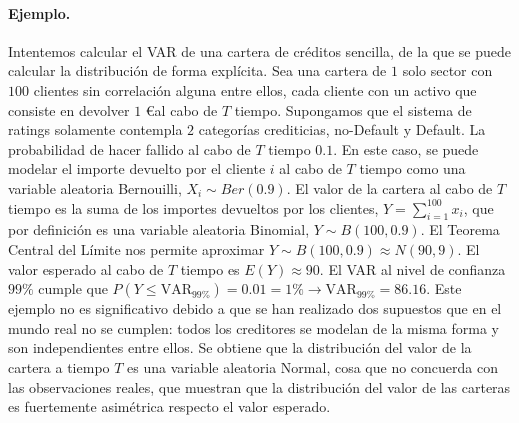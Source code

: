\paragraph{Ejemplo.} Intentemos calcular el VAR de una cartera de cr\'editos
sencilla, de la que se puede calcular la distribuci\'on de forma expl\'icita. 
Sea una cartera de $1$ solo sector con $100$ clientes sin correlaci\'on alguna
entre ellos, cada cliente con un activo que consiste en devolver $1$ \euro al 
cabo de $T$ tiempo. Supongamos que el sistema de ratings solamente contempla 
$2$ categor\'ias crediticias, no-Default y Default. La probabilidad de hacer 
fallido al cabo de $T$ tiempo $0.1$.
\newline
\newline
En este caso, se puede modelar el importe devuelto por el cliente $i$ al cabo 
de $T$ tiempo como una variable aleatoria Bernouilli, $X_i \sim Ber(0.9)$. El 
valor de la cartera al cabo de $T$ tiempo es la suma de los importes devueltos 
por los clientes, $Y = \sum_{i=1}^{100} x_i$, que por definici\'on es una 
variable aleatoria Binomial, $Y \sim B(100,0.9)$. El Teorema Central del 
L\'imite nos permite aproximar $Y \sim B(100,0.9) \approx N(90, 9)$.
\newline
\newline
El valor esperado al cabo de $T$ tiempo es $E(Y) \approx 90$. El VAR al nivel 
de confianza $99\%$ cumple que $P(Y \leq \textrm{VAR}_{99\%}) = 0.01 = 1\% 
\longrightarrow \textrm{VAR}_{99\%}=86.16$.
\newline
\newline
Este ejemplo no es significativo debido a que se han realizado dos supuestos 
que en el mundo real no se cumplen: todos los creditores se modelan de la misma 
forma y son independientes entre ellos. Se obtiene que la distribuci\'on del 
valor de la cartera a tiempo $T$ es una variable aleatoria Normal, cosa que no
concuerda con las observaciones reales, que muestran que la distribuci\'on del 
valor de las carteras es fuertemente asim\'etrica respecto el valor esperado.

